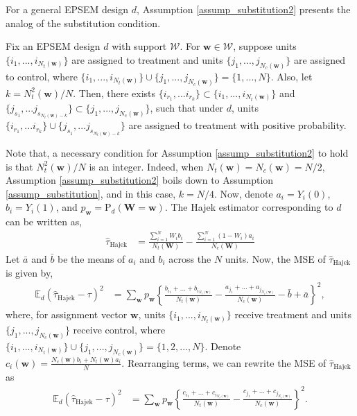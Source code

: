 \documentclass[12pt]{article}
\newcommand{\E}{{\mathbb{E}}}
\renewcommand{\Pr}{{\text{P}}}
\begin{document}
For a general EPSEM design $d$, Assumption \ref{assump_substitution2} presents the analog of the substitution condition.
\begin{assumption} \normalfont
Fix an EPSEM design $d$ with support $\mathcal{W}$. For $\bm{w} \in \mathcal{W}$, suppose units $\{i_1,...,i_{N_t(\bm{w})}\}$ are assigned to treatment and units $\{j_1,...,j_{N_c(\bm{w})}\}$ are assigned to control, where $\{i_1,...,i_{N_t(\bm{w})}\} \cup \{j_1,...,j_{N_c(\bm{w})}\} = \{1,...,N\}$. Also, let $k = N^2_t(\bm{w})/N$.
Then, there exists $\{i_{r_1},...i_{r_{k}}\} \subset \{i_1,...,i_{N_t(\bm{w})}\}$ and $\{j_{s_1},...j_{s_{N_t(\bm{w}) - k}}\} \subset \{j_1,...,j_{N_c(\bm{w})}\}$, such that under $d$, units $\{i_{r_1},...i_{r_{k}}\} \cup \{j_{s_1},...j_{s_{N_t(\bm{w}) - k}}\}$ are assigned to treatment with positive probability. \label{assump_substitution2}  
\end{assumption}
Note that, a necessary condition for Assumption \ref{assump_substitution2} to hold is that $N^2_t(\bm{w})/{N}$ is an integer. Indeed, when $N_t(\bm{w}) = N_c(\bm{w}) = N/2$, Assumption \ref{assump_substitution2} boils down to Assumption \ref{assump_substitution}, and in this case, $k = N/4$. Now, denote $a_i = Y_i(0)$, $b_i = Y_i(1)$, and $p_{\bm{w}} = \Pr_d(\bm{W} = \bm{w})$.
The Hajek estimator corresponding to $d$ can be written as,
\begin{align}
\hat{\tau}_{\text{Hajek}} & = \frac{\sum_{i=1}^{N}W_ib_i}{N_t(\bm{W})} - \frac{\sum_{i=1}^{N}(1-W_i)a_i}{N_c(\bm{W})}    
\end{align}
Let $\bar{a}$ and $\bar{b}$ be the means of $a_i$ and $b_i$ across the $N$ units. Now, the MSE of $\hat{\tau}_{\text{Hajek}}$ is given by,
\begin{align}
 \E_d(\hat{\tau}_{\text{Hajek}} - \tau)^2 & = \sum_{\bm{w}} p_{\bm{w}} \left\{\frac{b_{i_1} + ... + b_{i_{N_t(\bm{w})}}}{N_t(\bm{w})} - \frac{a_{j_1} + ... + a_{j_{N_c(\bm{w})}}}{N_c(\bm{w})} - \bar{b} + \bar{a}\right\}^2,  
\end{align}
where, for assignment vector $\bm{w}$, units $\{i_1,...,i_{N_t(\bm{w})}\}$ receive treatment and units $\{j_1,...,j_{N_c(\bm{w})}\}$ receive control, where $\{i_1,...,i_{N_t(\bm{w})}\}\cup\{j_1,...,j_{N_c(\bm{w})}\} = \{1,2,...,N\}$. Denote $c_i(\bm{w})  = \frac{N_c(\bm{w})b_i + N_t(\bm{w})a_i}{N}$. Rearranging terms, we can rewrite the MSE of $\hat{\tau}_{\text{Hajek}}$ as 
\begin{align}
    \E_d(\hat{\tau}_{\text{Hajek}} - \tau)^2 &= \sum_{\bm{w}} p_{\bm{w}} \left\{\frac{c_{i_1} + ... + c_{i_{N_t(\bm{w})}}}{N_t(\bm{w})} - \frac{c_{j_1} + ... + c_{j_{N_c(\bm{w})}}}{N_c(\bm{w})}\right\}^2.
\end{align}
\end{document}
